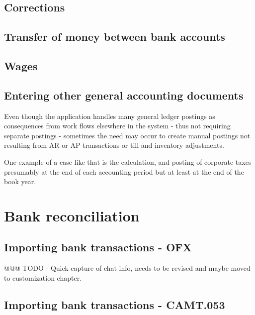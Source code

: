 \subsection{Corrections}
\label{subsec-business-processes-accounting-correction-transaction-entry}

\subsection{Transfer of money between bank accounts}
\label{subsec-business-processes-accounting-entry-bank-to-bank-transactions}

\subsection{Wages}
\label{subsec-business-processes-accounting-entry-of-wages}

\subsection{Entering other general accounting documents}
\label{subsec-business-processes-accounting-entry-others}

Even though the application handles many general ledger postings as consequences
from work flows elsewhere in the system - thus not requiring separate postings -
sometimes the need may occur to create manual postings not resulting from
AR or AP transactions or till and inventory adjustments.

One example of a case like that is the calculation, and posting of
corporate taxes presumably at the end of each accounting period but at least
at the end of the book year.



\section{Bank reconciliation}
\label{sec-business-processes-accounting-reconciliation}

\subsection{Importing bank transactions - OFX}
\label{subsec-importing-bank-transactions-ofx}

@@@ TODO - Quick capture of chat info, needs to be revised and maybe moved to customization chapter.

\subsection{Importing bank transactions - CAMT.053}
\label{subsec-importing-bank-transactions-camt}

